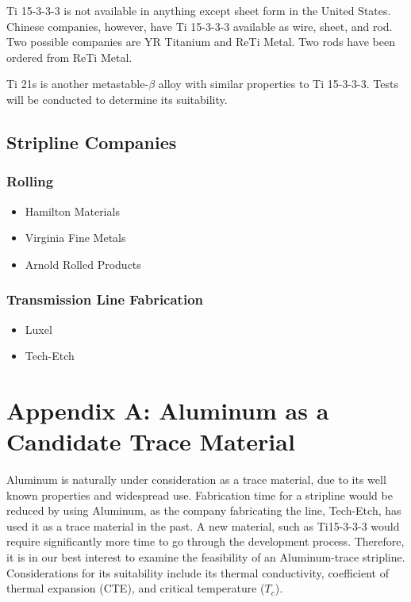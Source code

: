 \documentclass{report}
\begin{document}
\begin{multicols}{2}
Ti 15-3-3-3 is not available in anything except sheet form in the United States. Chinese companies, however, have Ti 15-3-3-3 available as wire, sheet, and rod. Two possible
companies are YR Titanium and ReTi Metal. Two rods have been ordered from ReTi Metal.

Ti 21s is another metastable-$\beta$ alloy with similar properties to Ti 15-3-3-3. Tests will be conducted to determine its suitability.

\subsection{Stripline Companies}
\subsubsection{Rolling}
\begin{itemize}
\item Hamilton Materials
\item Virginia Fine Metals
\item Arnold Rolled Products
\end{itemize}

\subsubsection{Transmission Line Fabrication}
\begin{itemize}
\item Luxel
\item Tech-Etch
\end{itemize}
\end{multicols}
\newpage

\section{Appendix A: Aluminum as a Candidate Trace Material}

Aluminum is naturally under consideration as a trace material, due to its well known properties and widespread use. Fabrication time for a stripline would be reduced by using Aluminum, as the company fabricating the line, Tech-Etch, has used it as a trace material in the past. A new material, such as Ti15-3-3-3 would require significantly more time to go through the development process. Therefore, it is in our best interest to examine the feasibility of an Aluminum-trace stripline. Considerations for its suitability include its thermal conductivity, coefficient of thermal expansion (CTE), and critical temperature ($T_{c}$).
\end{document}
